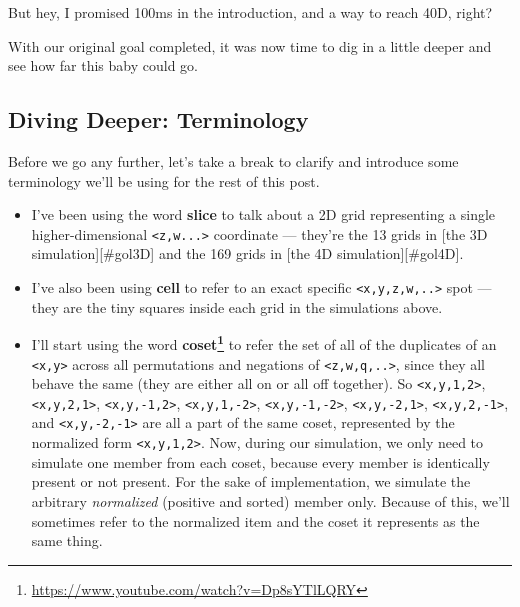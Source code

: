 \documentclass[]{article}
\renewcommand{\href}[2]{#2\footnote{\url{#1}}}
\begin{document}
But hey, I promised 100ms in the introduction, and a way to reach 40D, right?

With our original goal completed, it was now time to dig in a little deeper and
see how far this baby could go.

\hypertarget{diving-deeper-terminology}{%
\subsection{Diving Deeper: Terminology}\label{diving-deeper-terminology}}

Before we go any further, let's take a break to clarify and introduce some
terminology we'll be using for the rest of this post.

\begin{itemize}
\item
  I've been using the word \textbf{slice} to talk about a 2D grid representing a
  single higher-dimensional \texttt{\textless{}z,w...\textgreater{}} coordinate
  --- they're the 13 grids in {[}the 3D simulation{]}{[}\#gol3D{]} and the 169
  grids in {[}the 4D simulation{]}{[}\#gol4D{]}.
\item
  I've also been using \textbf{cell} to refer to an exact specific
  \texttt{\textless{}x,y,z,w,..\textgreater{}} spot --- they are the tiny
  squares inside each grid in the simulations above.
\item
  I'll start using the word
  \textbf{\href{https://www.youtube.com/watch?v=Dp8sYTlLQRY}{coset}} to refer
  the set of all of the duplicates of an \texttt{\textless{}x,y\textgreater{}}
  across all permutations and negations of
  \texttt{\textless{}z,w,q,..\textgreater{}}, since they all behave the same
  (they are either all on or all off together). So
  \texttt{\textless{}x,y,1,2\textgreater{}},
  \texttt{\textless{}x,y,2,1\textgreater{}},
  \texttt{\textless{}x,y,-1,2\textgreater{}},
  \texttt{\textless{}x,y,1,-2\textgreater{}},
  \texttt{\textless{}x,y,-1,-2\textgreater{}},
  \texttt{\textless{}x,y,-2,1\textgreater{}},
  \texttt{\textless{}x,y,2,-1\textgreater{}}, and
  \texttt{\textless{}x,y,-2,-1\textgreater{}} are all a part of the same coset,
  represented by the normalized form \texttt{\textless{}x,y,1,2\textgreater{}}.
  Now, during our simulation, we only need to simulate one member from each
  coset, because every member is identically present or not present. For the
  sake of implementation, we simulate the arbitrary \emph{normalized} (positive
  and sorted) member only. Because of this, we'll sometimes refer to the
  normalized item and the coset it represents as the same thing.

\end{itemize}
\end{document}
